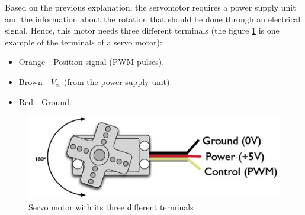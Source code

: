 Based on the previous explanation, the servomotor requires a power supply unit and the information about the rotation that should be done through an electrical signal. Hence, this motor needs three different terminals (the figure \ref{cable_servo} is one example of the terminals of a servo motor):
\begin{itemize}  
        \item Orange - Position signal (PWM pulses).
        \item Brown - $V_{cc}$ (from the power supply unit). 
        \item Red - Ground.
\end{itemize}

\begin{figure}[H]
\centering
\includegraphics[scale=0.7]{figures/cable_servo.jpg}
\caption{Servo motor with its three different terminals}
\label{cable_servo}
\end{figure}

